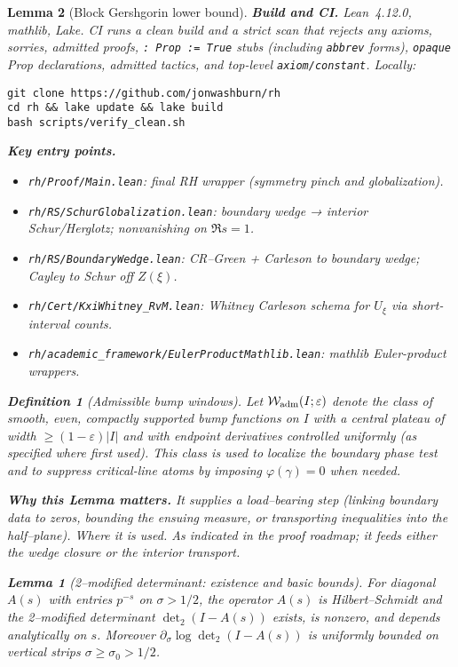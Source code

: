 \documentclass[11pt]{article}
\newtheorem{lemma}{Lemma}[section]
\theoremstyle{definition}
\newtheorem{definition}{Definition}[section]
\theoremstyle{remark}
\begin{document}
\begin{lemma}[Block Gershgorin lower bound]
\noindent\textbf{Build and CI.} Lean~4.12.0, mathlib, Lake. CI runs a clean build and a strict scan that rejects any axioms, sorries, admitted proofs, \texttt{: Prop := True} stubs (including \texttt{abbrev} forms), \texttt{opaque} Prop declarations, admitted tactics, and top-level \texttt{axiom/constant}. Locally:
\begin{verbatim}
git clone https://github.com/jonwashburn/rh
cd rh && lake update && lake build
bash scripts/verify_clean.sh
\end{verbatim}

\noindent\textbf{Key entry points.}
\begin{itemize}
  \item \texttt{rh/Proof/Main.lean}: final RH wrapper (symmetry pinch and globalization).
  \item \texttt{rh/RS/SchurGlobalization.lean}: boundary wedge → interior Schur/Herglotz; nonvanishing on \(\Re s=1\).
  \item \texttt{rh/RS/BoundaryWedge.lean}: CR–Green + Carleson to boundary wedge; Cayley to Schur off \(Z(\xi)\).
  \item \texttt{rh/Cert/KxiWhitney\_RvM.lean}: Whitney Carleson schema for \(U_\xi\) via short-interval counts.
  \item \texttt{rh/academic\_framework/EulerProductMathlib.lean}: mathlib Euler-product wrappers.
\end{itemize}

\begin{definition}[Admissible bump windows]\label{def:adm-bumps}
Let $\mathcal W_{\rm adm}(I;\varepsilon)$ denote the class of smooth, even, compactly supported bump functions on $I$ with a central plateau of width $\ge (1-\varepsilon)|I|$ and with endpoint derivatives controlled uniformly (as specified where first used). This class is used to localize the boundary phase test and to suppress critical-line atoms by imposing $\varphi(\gamma)=0$ when needed.
\end{definition}

\noindent\textbf{Why this Lemma matters.} It supplies a load--bearing step (linking boundary data to zeros, bounding the ensuing measure, or transporting inequalities into the half--plane).
\noindent\textit{Where it is used.} As indicated in the proof roadmap; it feeds either the wedge closure or the interior transport.
\begin{lemma}[2--modified determinant: existence and basic bounds]\label{lem:det2-unsmoothed}
For diagonal $A(s)$ with entries $p^{-s}$ on $\sigma>1/2$, the operator $A(s)$ is Hilbert--Schmidt and the 2--modified determinant $\det\nolimits_2(I-A(s))$ exists, is nonzero, and depends analytically on $s$. Moreover $\partial_\sigma \log\det\nolimits_2(I-A(s))$ is uniformly bounded on vertical strips $\sigma\ge \sigma_0>1/2$.
\end{lemma}


\end{lemma}
\end{document}
